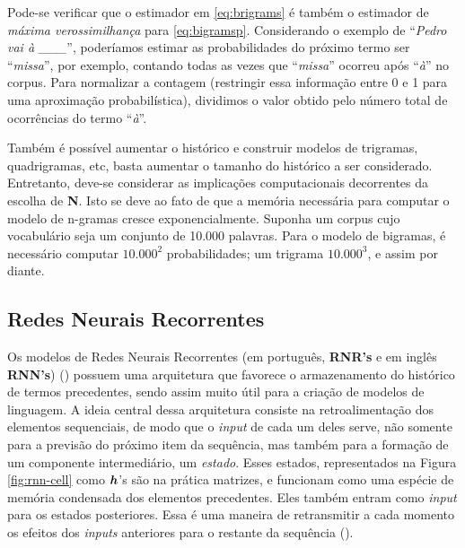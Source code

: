 Pode-se verificar que o estimador em \ref{eq:brigrams} é também o estimador de \textit{máxima verossimilhança} para \ref{eq:bigramsp}.
Considerando o exemplo de “\textit{Pedro vai à \_\_\_}”, poderíamos estimar as probabilidades do próximo termo ser “\textit{missa}”, por exemplo, contando todas as vezes que “\textit{missa}” ocorreu após “\textit{à}” no corpus. Para normalizar a contagem (restringir essa informação entre 0 e 1 para uma aproximação probabilística), dividimos o valor obtido pelo número total de ocorrências do termo “\textit{à}”.

Também é possível aumentar o histórico e construir modelos de trigramas, quadrigramas, etc, basta aumentar o tamanho do histórico a ser considerado. Entretanto, deve-se considerar as implicações computacionais decorrentes da escolha de \textbf{N}. Isto se deve ao fato de que a memória necessária para computar o modelo de n-gramas cresce exponencialmente. Suponha um corpus cujo vocabulário seja um conjunto de 10.000 palavras. Para o modelo de bigramas, é necessário computar $10.000^{2}$ probabilidades; um trigrama $10.000^{3}$, e assim por diante.


\subsection{Redes Neurais Recorrentes}
\label{sec:RNN}

Os modelos de Redes Neurais Recorrentes (em português, \textbf{RNR's} e em inglês \textbf{RNN's}) (\cite{Goodfellow-et-al-2016}) possuem uma arquitetura que favorece o armazenamento do histórico de termos precedentes, sendo assim muito útil para a criação de modelos de linguagem. A ideia central dessa arquitetura consiste na retroalimentação dos elementos sequenciais, de modo que o \textit{input} de cada um deles serve, não somente para a previsão do próximo item da sequência, mas também para a formação de um componente intermediário, um \textit{estado}. Esses estados, representados na Figura \ref{fig:rnn-cell} como $\bm{h}$'s são na prática matrizes, e funcionam como uma espécie de memória condensada dos elementos precedentes. Eles também entram como \textit{input }para os estados posteriores. Essa é uma maneira de retransmitir a cada momento os efeitos dos \textit{inputs} anteriores para o restante da sequência (\cite{Goodfellow-et-al-2016}). 



